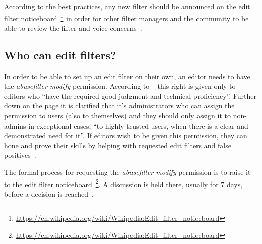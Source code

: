According to the best practices, any new filter should be announced on the edit filter noticeboard~\footnote{\url{https://en.wikipedia.org/wiki/Wikipedia:Edit_filter_noticeboard}} in order for other filter managers and the community to be able to review the filter and voice concerns~\cite{Wikipedia:EditFilter}.

\subsection{Who can edit filters?}
\label{subsection:who-can-edit}

In order to be able to set up an edit filter on their own, an editor needs to have the \emph{abusefilter-modify} permission.
According to ~\cite{Wikipedia:EditFilter} this right is given only to editors who ``have the required good judgment and technical proficiency''.
Further down on the page it is clarified that it's administrators who can assign the permission to users (also to themselves) and they should only assign it to non-admins in exceptional cases, ``to highly trusted users, when there is a clear and demonstrated need for it''.
If editors wish to be given this permission, they can hone and prove their skills by helping with requested edit filters and false positives~\cite{Wikipedia:EditFilter}.

The formal process for requesting the \emph{abusefilter-modify} permission is to raise it to the edit filter noticeboard~\footnote{\url{https://en.wikipedia.org/wiki/Wikipedia:Edit_filter_noticeboard}}.
A discussion is held there, usually for 7 days, before a decision is reached~\cite{Wikipedia:EditFilter}.

